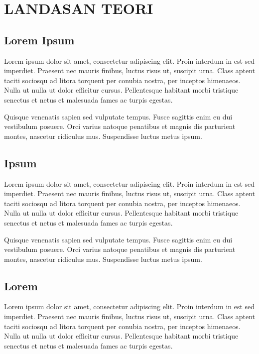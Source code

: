 \chapter{LANDASAN TEORI}

\section{Lorem Ipsum}

Lorem ipsum dolor sit amet, consectetur adipiscing elit. Proin interdum in est sed imperdiet. Praesent nec mauris finibus, luctus risus ut, suscipit urna. Class aptent taciti sociosqu ad litora torquent per conubia nostra, per inceptos himenaeos. Nulla ut nulla ut dolor efficitur cursus. Pellentesque habitant morbi tristique senectus et netus et malesuada fames ac turpis egestas.

Quisque venenatis sapien sed vulputate tempus. Fusce sagittis enim eu dui vestibulum posuere. Orci varius natoque penatibus et magnis dis parturient montes, nascetur ridiculus mus. Suspendisse luctus metus ipsum.

\section{Ipsum}

Lorem ipsum dolor sit amet, consectetur adipiscing elit. Proin interdum in est sed imperdiet. Praesent nec mauris finibus, luctus risus ut, suscipit urna. Class aptent taciti sociosqu ad litora torquent per conubia nostra, per inceptos himenaeos. Nulla ut nulla ut dolor efficitur cursus. Pellentesque habitant morbi tristique senectus et netus et malesuada fames ac turpis egestas.

Quisque venenatis sapien sed vulputate tempus. Fusce sagittis enim eu dui vestibulum posuere. Orci varius natoque penatibus et magnis dis parturient montes, nascetur ridiculus mus. Suspendisse luctus metus ipsum.

\section{Lorem}

Lorem ipsum dolor sit amet, consectetur adipiscing elit. Proin interdum in est sed imperdiet. Praesent nec mauris finibus, luctus risus ut, suscipit urna. Class aptent taciti sociosqu ad litora torquent per conubia nostra, per inceptos himenaeos. Nulla ut nulla ut dolor efficitur cursus. Pellentesque habitant morbi tristique senectus et netus et malesuada fames ac turpis egestas.

